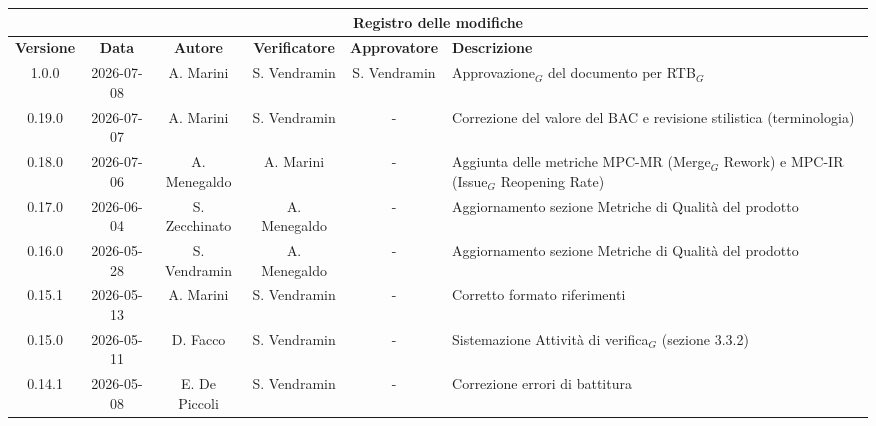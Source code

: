 \documentclass[a4paper, 10pt]{article}
\begin{document}
\newcommand{\titolo}{Norme di Progetto}
\newcommand{\dataverbale}{}
\newcommand{\dataversione}{2026-06-16}
\newcommand{\versione}{1.0.0}
\newcommand{\stato}{Approvato}
\newcommand{\destinatari}{The Bitless, prof. Tullio Vardanega, prof. Riccardo Cardin}
\def\templatedir{../../../templates}

\begin{titlepage}

\end{titlepage}

\newpage
{}

\begingroup
\small
\begin{longtable}{|c|c|c|c|c|p{3cm}|}
    \hline
    \multicolumn{6}{|c|}{\textbf{Registro delle modifiche}} \\
    \hline
    \textbf{Versione} & \textbf{Data} & \textbf{Autore} & \textbf{Verificatore} & \textbf{Approvatore} & \textbf{Descrizione} \\
    \hline
    \endhead
    1.0.0 & 2026-07-08 & A. Marini & S. Vendramin & S. Vendramin & Approvazione$_G$ del documento per RTB$_G$ \\ \hline

    0.19.0 & 2026-07-07 & A. Marini & S. Vendramin & - & Correzione del valore del BAC e revisione stilistica (terminologia) \\ \hline

    0.18.0 & 2026-07-06 & A. Menegaldo & A. Marini & - & Aggiunta delle metriche MPC-MR (Merge$_G$ Rework) e MPC-IR (Issue$_G$ Reopening Rate) \\ \hline

    0.17.0 & 2026-06-04 & S. Zecchinato & A. Menegaldo & - & Aggiornamento sezione Metriche di Qualità del prodotto \\ \hline

    0.16.0 & 2026-05-28 & S. Vendramin & A. Menegaldo & - & Aggiornamento sezione Metriche di Qualità del prodotto \\ \hline

    0.15.1 & 2026-05-13 & A. Marini & S. Vendramin & - & Corretto formato riferimenti \\ \hline

    0.15.0 & 2026-05-11 & D. Facco & S. Vendramin & - & Sistemazione Attività di verifica$_G$ (sezione 3.3.2) \\ \hline

    0.14.1 & 2026-05-08 & E. De Piccoli & S. Vendramin & - & Correzione errori di battitura \\ \hline


\end{longtable}
\end{document}
